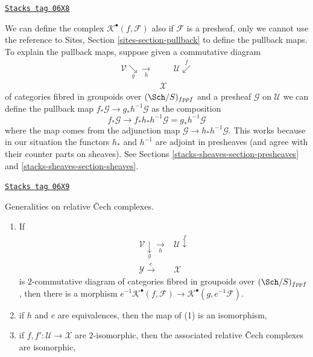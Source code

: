 \begin{remark}
\label{stacks-sheaves-remark-cech-complex-presheaves}
\href{https://stacks.math.columbia.edu/tag/06X8}{\texttt{Stacks tag 06X8}}

We can define the complex $\mathcal{K}^\bullet(f, \mathcal{F})$
also if $\mathcal{F}$ is a presheaf, only we cannot use the reference to
Sites, Section \ref{sites-section-pullback}
to define the pullback maps. To explain the pullback maps, suppose
given a commutative diagram
$$
\begin{array}{ccc}\mathcal{V} \underset{g}{\searrow}\underset{h}{\longrightarrow} &  & \mathcal{U} \overset{f}{\swarrow} \\  & \mathcal{X} & \end{array}
$$
of categories fibred in groupoids over $(\Sch/S)_{fppf}$
and a presheaf $\mathcal{G}$ on $\mathcal{U}$
we can define the pullback map $f_*\mathcal{G} \to g_*h^{-1}\mathcal{G}$
as the composition
$$
f_*\mathcal{G} \longrightarrow
f_*h_*h^{-1}\mathcal{G} = g_*h^{-1}\mathcal{G}
$$
where the map comes from the adjunction map
$\mathcal{G} \to h_*h^{-1}\mathcal{G}$. This works because in our situation
the functors $h_*$ and $h^{-1}$ are adjoint in presheaves (and agree with
their counter parts on sheaves). See
Sections \ref{stacks-sheaves-section-presheaves} and \ref{stacks-sheaves-section-sheaves}.
\end{remark}

\begin{lemma}
\label{stacks-sheaves-lemma-generalities-sheafified}
\href{https://stacks.math.columbia.edu/tag/06X9}{\texttt{Stacks tag 06X9}}

Generalities on relative {\v C}ech complexes.
\begin{enumerate}
\item If
$$
\begin{array}{cc}\mathcal{V} \underset{g}{\downarrow}\underset{h}{\longrightarrow} & \mathcal{U} \overset{f}{\downarrow} \\ \mathcal{Y} \overset{e}{\longrightarrow} & \mathcal{X}\end{array}
$$
is $2$-commutative diagram of categories fibred in groupoids over
$(\Sch/S)_{fppf}$, then there is a morphism
$e^{-1}\mathcal{K}^\bullet(f, \mathcal{F}) \to
\mathcal{K}^\bullet(g, e^{-1}\mathcal{F})$.
\item if $h$ and $e$ are equivalences, then the map of (1) is an isomorphism,
\item if $f, f' : \mathcal{U} \to \mathcal{X}$ are $2$-isomorphic, then
the associated relative {\v C}ech complexes are isomorphic,
\end{enumerate}
\end{lemma}

